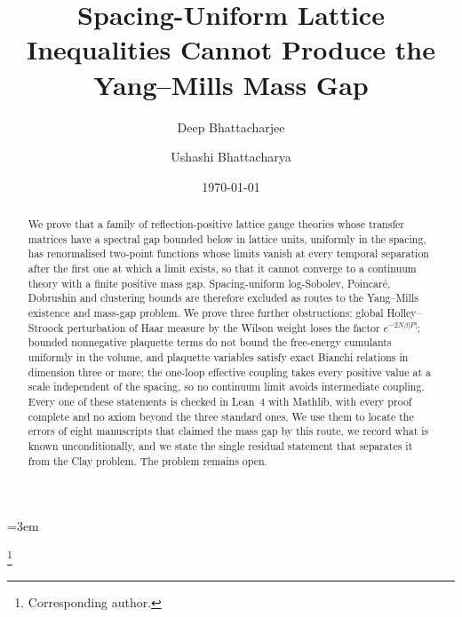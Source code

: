 \documentclass[aps,prd,twocolumn,superscriptaddress,nofootinbib,floatfix]{revtex4-2}
\theoremstyle{definition}
\theoremstyle{remark}
\begin{document}
\emergencystretch=3em

\title{Spacing-Uniform Lattice Inequalities Cannot Produce the Yang--Mills Mass Gap}

\author{Deep Bhattacharjee}
\thanks{Corresponding author.}

\author{Ushashi Bhattacharya}

\date{\today}

\begin{abstract}
We prove that a family of reflection-positive lattice gauge theories whose
transfer matrices have a spectral gap bounded below in lattice units,
uniformly in the spacing, has renormalised two-point functions whose limits
vanish at every temporal separation after the first one at which a limit
exists, so that it cannot converge to a continuum theory with a finite
positive mass gap. Spacing-uniform log-Sobolev, Poincar\'e, Dobrushin and
clustering bounds are therefore excluded as routes to the Yang--Mills
existence and mass-gap problem. We prove three further obstructions: global
Holley--Stroock perturbation of Haar measure by the Wilson weight loses the
factor $e^{-2N\beta|P|}$; bounded nonnegative plaquette terms do not bound
the free-energy cumulants uniformly in the volume, and plaquette variables
satisfy exact Bianchi relations in dimension three or more; the one-loop
effective coupling takes every positive value at a scale independent of the
spacing, so no continuum limit avoids intermediate coupling. Every one of
these statements is checked in Lean~4 with Mathlib, with every proof complete
and no axiom beyond the three standard ones. We use them to locate the
errors of eight manuscripts that claimed the mass gap by this route, we
record what is known unconditionally, and we state the single residual
statement that separates it from the Clay problem. The problem remains open.
\end{abstract}

\maketitle

\tableofcontents
\end{document}
